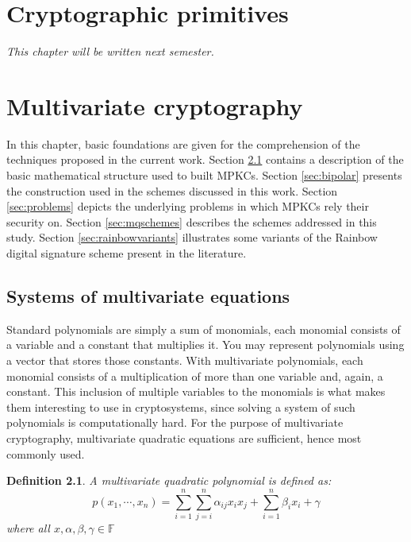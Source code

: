 \documentclass{ufsctex/ufsctex}
\newtheorem{definition}{Definition}
\begin{document}
\chapter{Cryptographic primitives}

\textit{This chapter will be written next semester.}

\chapter{Multivariate cryptography}

In this chapter, basic foundations are given for the comprehension of the
techniques proposed in the current work. Section \ref{sec:mqsystems} contains a
description of the basic mathematical structure used to built MPKCs. Section
\ref{sec:bipolar} presents the construction used in the schemes discussed in
this work. Section \ref{sec:problems} depicts the underlying problems in which
MPKCs rely their security on. Section \ref{sec:mqschemes} describes the schemes
addressed in this study. Section \ref{sec:rainbowvariants} illustrates some
variants of the Rainbow digital signature scheme present in the literature.

\section{Systems of multivariate equations}\label{sec:mqsystems}

Standard polynomials are simply a sum of monomials, each monomial consists of a
variable and a constant that multiplies it. You may represent polynomials using
a vector that stores those constants. With multivariate polynomials, each
monomial consists of a multiplication of more than one variable and, again, a
constant. This inclusion of multiple variables to the monomials is what makes
them interesting to use in cryptosystems, since solving a system of such
polynomials is computationally hard. For the purpose of multivariate
cryptography, multivariate quadratic equations are sufficient, hence most
commonly used.

\begin{definition}
A multivariate quadratic polynomial is defined as:
\begin{equation}
p(x_1,\cdots,x_n) = \sum_{i=1}^n \sum_{j=i}^n \alpha_{ij} x_i x_j +
	\sum_{i=1}^n \beta_i x_i + \gamma
\end{equation}
where all $x, \alpha, \beta, \gamma \in \mathbb{F}$
\end{definition}
\end{document}
